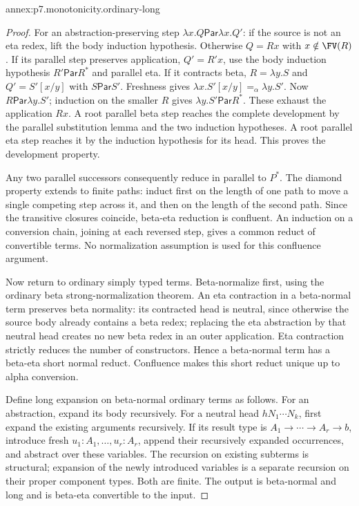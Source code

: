 \begin{annexitem}{annex:p7.monotonicity.ordinary-long}
\begin{proof}
For an abstraction-preserving step
\(\lambda x.Q\mathrel{\mathsf{Par}}\lambda x.Q'\):
if the source is not an eta redex, lift the body induction hypothesis.
Otherwise \(Q=Rx\) with \(x\notin\FV(R)\).
If its parallel step preserves application, \(Q'=R'x\), use the body
induction hypothesis \(R'\mathrel{\mathsf{Par}}R^*\) and parallel eta.
If it contracts beta, \(R=\lambda y.S\) and
\(Q'=S'[x/y]\) with \(S\mathrel{\mathsf{Par}}S'\).
Freshness gives \(\lambda x.S'[x/y]=_\alpha\lambda y.S'\).
Now \(R\mathrel{\mathsf{Par}}\lambda y.S'\); induction on the smaller
\(R\) gives \(\lambda y.S'\mathrel{\mathsf{Par}}R^*\).
These exhaust the application \(Rx\).
A root parallel beta step reaches the complete development by the
parallel substitution lemma and the two induction hypotheses.
A root parallel eta step reaches it by the induction hypothesis for its
head. This proves the development property.

Any two parallel successors consequently reduce in parallel to \(P^*\).
The diamond property extends to finite paths: induct first on the length
of one path to move a single competing step across it, and then on the
length of the second path. Since the transitive closures coincide,
beta-eta reduction is confluent. An induction on a conversion chain,
joining at each reversed step, gives a common reduct of convertible
terms. No normalization assumption is used for this confluence argument.

Now return to ordinary simply typed terms. Beta-normalize first, using
the ordinary beta strong-normalization theorem. An eta contraction in a
beta-normal term preserves beta normality: its contracted head is neutral,
since otherwise the source body already contains a beta redex; replacing
the eta abstraction by that neutral head creates no new beta redex in an
outer application. Eta contraction strictly reduces the number of
constructors. Hence a beta-normal term has a beta-eta short normal reduct.
Confluence makes this short reduct unique up to alpha conversion.

Define long expansion on beta-normal ordinary terms as follows.
For an abstraction, expand its body recursively.
For a neutral head \(hN_1\cdots N_k\), first expand the existing arguments
recursively. If its result type is
\(A_1\to\cdots\to A_r\to b\), introduce fresh
\(u_1:A_1,\ldots,u_r:A_r\), append their recursively expanded occurrences,
and abstract over these variables.
The recursion on existing subterms is structural; expansion of the newly
introduced variables is a separate recursion on their proper component
types. Both are finite. The output is beta-normal and long and is
beta-eta convertible to the input.


\end{proof}
\end{annexitem}
